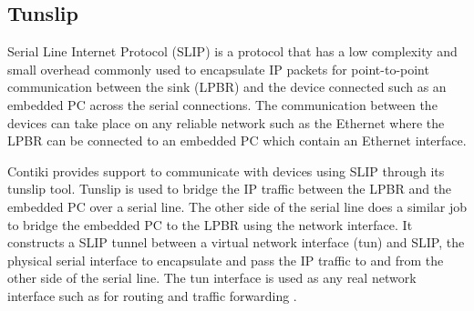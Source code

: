
\subsection{Tunslip}
Serial Line Internet Protocol (SLIP) \cite{slip} is a protocol that has a low complexity and small overhead commonly used to encapsulate IP packets for point-to-point communication between the sink (LPBR) and the device connected such as an embedded PC across the serial connections. The communication between the devices can take place on any reliable network such as the Ethernet where the LPBR can be connected to an embedded PC which contain an Ethernet interface.


Contiki provides support to communicate with devices using SLIP through its tunslip tool. Tunslip is used to bridge the IP traffic between the LPBR and the embedded PC over a serial line. The other side of the serial line does a similar job to bridge the embedded PC to the LPBR using the network interface. It constructs a SLIP tunnel between a virtual network interface (tun) and SLIP, the physical serial interface to encapsulate and pass the IP traffic to and from the other side of the serial line. The tun interface is used as any real network interface such as for routing and traffic forwarding \cite{tunslip, multipleSinks}.


